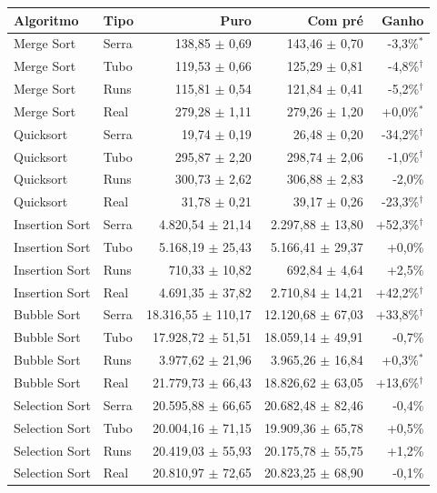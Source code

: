 \footnotesize
\begin{tabular}{llrrr}
\hline
\textbf{Algoritmo} & \textbf{Tipo} & \textbf{Puro} & \textbf{Com pré} & \textbf{Ganho} \\
\hline
Merge Sort & Serra & 138,85 $\pm$ 0,69 & 143,46 $\pm$ 0,70 & -3,3\%$^{*}$ \\
Merge Sort & Tubo & 119,53 $\pm$ 0,66 & 125,29 $\pm$ 0,81 & -4,8\%$^{\dagger}$ \\
Merge Sort & Runs & 115,81 $\pm$ 0,54 & 121,84 $\pm$ 0,41 & -5,2\%$^{\dagger}$ \\
Merge Sort & Real & 279,28 $\pm$ 1,11 & 279,26 $\pm$ 1,20 & +0,0\%$^{*}$ \\
Quicksort & Serra & 19,74 $\pm$ 0,19 & 26,48 $\pm$ 0,20 & -34,2\%$^{\dagger}$ \\
Quicksort & Tubo & 295,87 $\pm$ 2,20 & 298,74 $\pm$ 2,06 & -1,0\%$^{\dagger}$ \\
Quicksort & Runs & 300,73 $\pm$ 2,62 & 306,88 $\pm$ 2,83 & -2,0\% \\
Quicksort & Real & 31,78 $\pm$ 0,21 & 39,17 $\pm$ 0,26 & -23,3\%$^{\dagger}$ \\
Insertion Sort & Serra & 4.820,54 $\pm$ 21,14 & 2.297,88 $\pm$ 13,80 & +52,3\%$^{\dagger}$ \\
Insertion Sort & Tubo & 5.168,19 $\pm$ 25,43 & 5.166,41 $\pm$ 29,37 & +0,0\% \\
Insertion Sort & Runs & 710,33 $\pm$ 10,82 & 692,84 $\pm$ 4,64 & +2,5\% \\
Insertion Sort & Real & 4.691,35 $\pm$ 37,82 & 2.710,84 $\pm$ 14,21 & +42,2\%$^{\dagger}$ \\
Bubble Sort & Serra & 18.316,55 $\pm$ 110,17 & 12.120,68 $\pm$ 67,03 & +33,8\%$^{\dagger}$ \\
Bubble Sort & Tubo & 17.928,72 $\pm$ 51,51 & 18.059,14 $\pm$ 49,91 & -0,7\% \\
Bubble Sort & Runs & 3.977,62 $\pm$ 21,96 & 3.965,26 $\pm$ 16,84 & +0,3\%$^{*}$ \\
Bubble Sort & Real & 21.779,73 $\pm$ 66,43 & 18.826,62 $\pm$ 63,05 & +13,6\%$^{\dagger}$ \\
Selection Sort & Serra & 20.595,88 $\pm$ 66,65 & 20.682,48 $\pm$ 82,46 & -0,4\% \\
Selection Sort & Tubo & 20.004,16 $\pm$ 71,15 & 19.909,36 $\pm$ 65,78 & +0,5\% \\
Selection Sort & Runs & 20.419,03 $\pm$ 55,93 & 20.175,78 $\pm$ 55,75 & +1,2\% \\
Selection Sort & Real & 20.810,97 $\pm$ 72,65 & 20.823,25 $\pm$ 68,90 & -0,1\% \\

\end{tabular}
